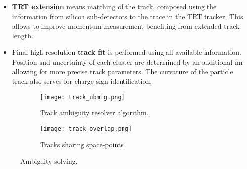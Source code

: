 \begin{itemize}
  		\item \textbf{TRT extension} means matching of the track, composed using the information from silicon sub-detectors to the trace in the TRT tracker. This allows to improve momentum measurement benefiting from extended track length.
  		\item Final high-resolution \textbf{track fit} is performed using all available information. Position and uncertainty of each cluster are determined by an additional \gls{nn} allowing for more precise track parameters. The curvature of the particle track also serves for charge sign identification.
  	\end{itemize}
  		\begin{figure}[htbp]
  		\begin{subfigure}[t]{0.65\textwidth}
  			\texttt{[image: track\_ubmig.png]}
  			\caption[Side view]{Track ambiguity resolver algorithm.}
  			\label{fig::tr_ambig}
  		\end{subfigure}
  		\hfill
  		\begin{subfigure}[t]{0.33\textwidth} 
  			\texttt{[image: track\_overlap.png]}
  			\caption[Share]{Tracks sharing space-points.}
  			\label{fig::tr_overlap}
  		\end{subfigure}
  		\caption{Ambiguity solving.}
  		\label{fig::tr_resol}
  	\end{figure}
